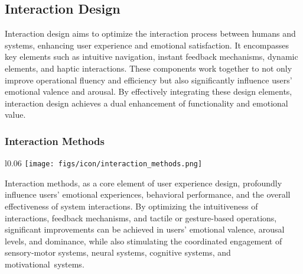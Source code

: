 \subsection{Interaction Design}
Interaction design aims to optimize the interaction process between humans and systems, enhancing user experience and emotional satisfaction. It encompasses key elements such as intuitive navigation, instant feedback mechanisms, dynamic elements, and haptic interactions. These components work together to not only improve operational fluency and efficiency but also significantly influence users’ emotional valence and arousal. By effectively integrating these design elements, interaction design achieves a dual enhancement of functionality and emotional value.




\subsubsection{Interaction Methods}
\begin{wrapfigure}{l}{0.06\textwidth}
   \vspace{-11pt} %
        \texttt{[image: figs/icon/interaction\_methods.png]}
\end{wrapfigure} 
Interaction methods, as a core element of user experience design, profoundly influence users’ emotional experiences, behavioral performance, and the overall effectiveness of system interactions. By optimizing the intuitiveness of interactions, feedback mechanisms, and tactile or gesture-based operations, significant improvements can be achieved in users’ emotional valence, arousal levels, and dominance, while also stimulating the coordinated engagement of sensory-motor systems, neural systems, cognitive systems, and motivational~systems.

